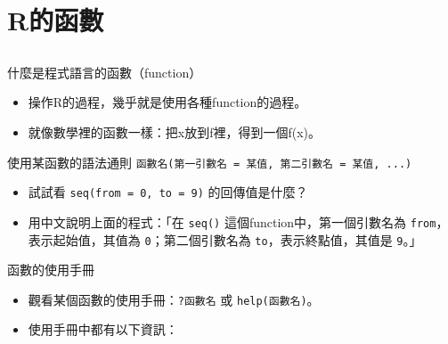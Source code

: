 \documentclass[12pt]{beamer}
\begin{document}
\section{R的函數}\subsection{}

\begin{frame}[fragile]{什麼是程式語言的函數（function）}
\begin{itemize}
\item 操作R的過程，幾乎就是使用各種function的過程。
\item 就像數學裡的函數一樣：把x放到f裡，得到一個f(x)。
\end{itemize}

\begin{block}{使用某函數的語法通則}
\verb+函數名(第一引數名 = 某值, 第二引數名 = 某值, ...)+ 
\end{block}

\begin{itemize}
\item 試試看 \verb+seq(from = 0, to = 9)+ 的回傳值是什麼？
\item 用中文說明上面的程式：「在 \verb+seq()+ 這個function中，第一個引數名為 \verb+from+，表示起始值，其值為 \verb+0+；第二個引數名為 \verb+to+，表示終點值，其值是 \verb+9+。」
\end{itemize}
\end{frame}



\begin{frame}[fragile]{函數的使用手冊}
\begin{itemize}
\item 觀看某個函數的使用手冊：\verb+?函數名+ 或 \verb+help(函數名)+。
\item 使用手冊中都有以下資訊：
\end{itemize}
\end{frame}
\end{document}
